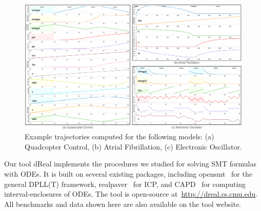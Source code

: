 \begin{figure}[h!]
\begin{center}
\includegraphics[width=\textwidth]{exp_figure}
\caption{Example trajectories computed for the following models: (a) Quadcopter Control, (b) Atrial Fibrillation, (c) Electronic Oscillator.}\label{fig:exp_figure}
\end{center}
\end{figure}

Our tool {\sf dReal} implements the procedures we studied for solving
SMT formulas with ODEs. It is built on several existing packages,
including {\sf opensmt}~\cite{DBLP:conf/tacas/BruttomessoPST10} for
the general DPLL(T) framework, {\sf
  realpaver}~\cite{DBLP:journals/toms/GranvilliersB06} for ICP, and
{\sf CAPD}~\cite{capd} for computing interval-enclosures of ODEs. The
tool is open-source at~\url{http://dreal.cs.cmu.edu}. All benchmarks
and data shown here are also available on the tool website.

